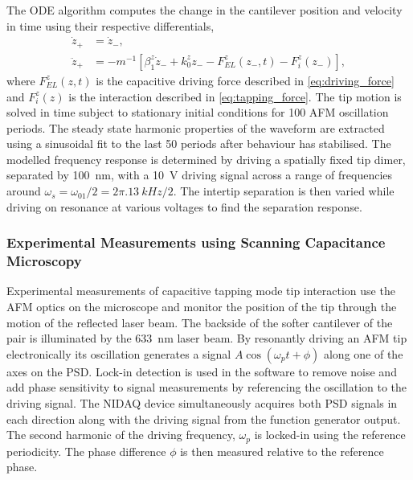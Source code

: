 \documentclass{article}
\begin{document}
The ODE algorithm computes the change in the cantilever position and velocity in time using their respective differentials,
\begin{align}
	\dot{z}_+ &= \dot{z}_-, \\
	\ddot{z}_+ &= -m^{-1}\left[\beta_1^z\dot{z}_- + k_0^zz_- - F_{EL}^z(z_-, t) - F_i^z(z_-)\right],
\end{align}
where $F_{EL}^z(z,t)$ is the capacitive driving force described in \eqref{eq:driving_force} and $F_i^z(z)$ is the interaction described in \eqref{eq:tapping_force}. The tip motion is solved in time subject to stationary initial conditions for 100 AFM oscillation periods. The steady state harmonic properties of the waveform are extracted using a sinusoidal fit to the last 50 periods after behaviour has stabilised.
The modelled frequency response is determined by driving a spatially fixed tip dimer, separated by \SI{100}{nm}, with a \SI{10}{V} driving signal across a range of frequencies around $\omega_s = \omega_{01}/2 = 2\pi.\SI{13}{kHz}/2$. The intertip separation is then varied while driving on resonance at various voltages to find the separation response.

\subsubsection{Experimental Measurements using Scanning Capacitance Microscopy}

Experimental measurements of capacitive tapping mode tip interaction use the AFM optics on the microscope and monitor the position of the tip through the motion of the reflected laser beam. The backside of the softer cantilever of the pair is illuminated by the \SI{633}{nm} laser beam. By resonantly driving an AFM tip electronically its oscillation generates a signal $A\cos(\omega_p t + \phi)$ along one of the axes on the PSD. Lock-in detection is used in the software to remove noise and add phase sensitivity to signal measurements by referencing the oscillation to the driving signal. The NIDAQ device simultaneously acquires both PSD signals in each direction along with the driving signal from the function generator output. The second harmonic of the driving frequency, $\omega_p$ is locked-in using the reference periodicity. The phase difference $\phi$ is then measured relative to the reference phase.%
\end{document}
